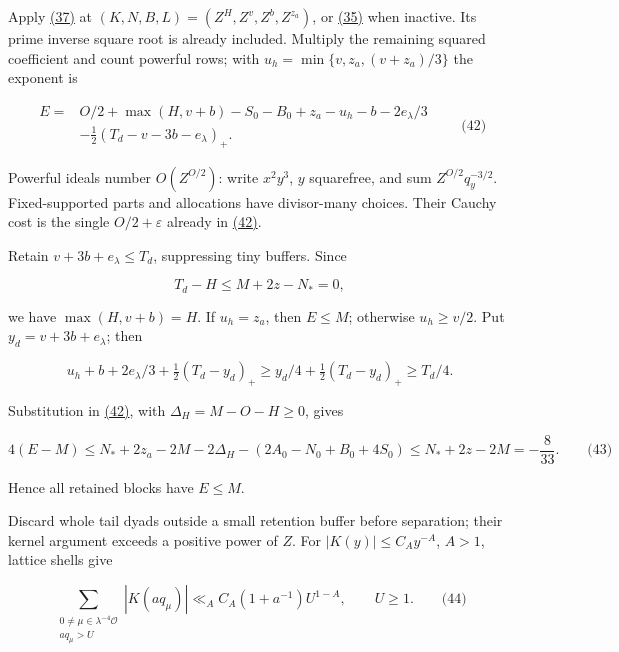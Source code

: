 Apply \protect\hyperlink{cf:eq:B.20}{(37)} at \((K,N,B,L)=(Z^H,Z^v,Z^b,Z^{z_a})\), or \protect\hyperlink{cf:eq:B.18}{(35)} when inactive. Its prime inverse square root is already included. Multiply the remaining squared coefficient and count powerful rows; with \(u_h=\min\{v,z_a,(v+z_a)/3\}\) the exponent is

\hypertarget{cf:eq:B.23}{}

\label{cf:eq:B.23}

\[
\begin{aligned}
 E={}&O/2+\max(H,v+b)-S_0-B_0+z_a-u_h-b-2e_\lambda/3\\
    &-\tfrac12(T_d-v-3b-e_\lambda)_+.
\end{aligned}
\qquad\text{(42)}
\]

Powerful ideals number \(O(Z^{O/2})\): write \(x^2y^3\), \(y\) squarefree, and sum \(Z^{O/2}q_y^{-3/2}\). Fixed-supported parts and allocations have divisor-many choices. Their Cauchy cost is the single \(O/2+\varepsilon\) already in \protect\hyperlink{cf:eq:B.23}{(42)}.

Retain \(v+3b+e_\lambda\le T_d\), suppressing tiny buffers. Since

\[
T_d-H\le M+2z-N_*=0,
\]

we have \(\max(H,v+b)=H\). If \(u_h=z_a\), then \(E\le M\); otherwise \(u_h\ge v/2\). Put \(y_d=v+3b+e_\lambda\); then

\[
u_h+b+2e_\lambda/3+\tfrac12(T_d-y_d)_+
 \ge y_d/4+\tfrac12(T_d-y_d)_+\ge T_d/4.
\]

Substitution in \protect\hyperlink{cf:eq:B.23}{(42)}, with \(\Delta_H=M-O-H\ge0\), gives

\hypertarget{cf:eq:B.24}{}

\label{cf:eq:B.24}

\[
4(E-M)\le N_*+2z_a-2M-2\Delta_H-(2A_0-N_0+B_0+4S_0)
 \le N_*+2z-2M=-\frac8{33}.
\qquad\text{(43)}
\]

Hence all retained blocks have \(E\le M\).

Discard whole tail dyads outside a small retention buffer before separation; their kernel argument exceeds a positive power of \(Z\). For \(|K(y)|\le C_Ay^{-A}\), \(A>1\), lattice shells give

\hypertarget{cf:eq:B.25}{}

\label{cf:eq:B.25}

\[
\sum_{\substack{0\ne\mu\in\lambda^{-4}\mathcal O\\a q_\mu>U}}
 |K(aq_\mu)|\ll_A C_A(1+a^{-1})U^{1-A},\qquad U\ge1.
\qquad\text{(44)}
\]

